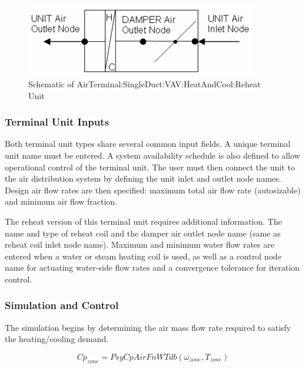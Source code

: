 \begin{figure}[hbtp] %
\centering
\includegraphics[width=0.9\textwidth, height=0.9\textheight, keepaspectratio=true]{media/image2792.png}
\caption{Schematic of AirTerminal:SingleDuct:VAV:HeatAndCool:Reheat Unit \protect \label{fig:schematic-of-airterminal-singleduct-vav-003}}
\end{figure}

\subsubsection{Terminal Unit Inputs}\label{terminal-unit-inputs}

Both terminal unit types share several common input fields. A unique terminal unit name must be entered. A system availability schedule is also defined to allow operational control of the terminal unit. The user must then connect the unit to the air distribution system by defining the unit inlet and outlet node names. Design air flow rates are then specified: maximum total air flow rate (autosizable) and minimum air flow fraction.

The reheat version of this terminal unit requires additional information. The name and type of reheat coil and the damper air outlet node name (same as reheat coil inlet node name). Maximum and minimum water flow rates are entered when a water or steam heating coil is used, as well as a control node name for actuating water-side flow rates and a convergence tolerance for iteration control.

\subsubsection{Simulation and Control}\label{simulation-and-control}

The simulation begins by determining the air mass flow rate required to satisfy the heating/cooling demand.

\begin{equation}
C{p_{zone}} = PsyCpAirFnWTdb\left( {{\omega_{zone}},{T_{zone}}} \right)
\end{equation}

